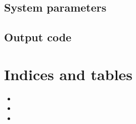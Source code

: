 \documentclass[letterpaper,10pt,english]{sphinxmanual}
\begin{document}
\section{System parameters}
\label{\detokenize{input_code:system-parameters}}\label{\detokenize{input_code:id1}}\label{\detokenize{input_code::doc}}

\section{Output code}
\label{\detokenize{output_code:output-code}}\label{\detokenize{output_code::doc}}

\chapter{Indices and tables}
\label{\detokenize{index:indices-and-tables}}\begin{itemize}
\item {} 

\item {} 

\item {} 

\end{itemize}


\renewcommand{\indexname}{Python Module Index}
\begin{sphinxtheindex}
\let\bigletter\sphinxstyleindexlettergroup
\bigletter{l}
\item\relax{}
\end{sphinxtheindex}

\renewcommand{\indexname}{Index}
\printindex
\end{document}
